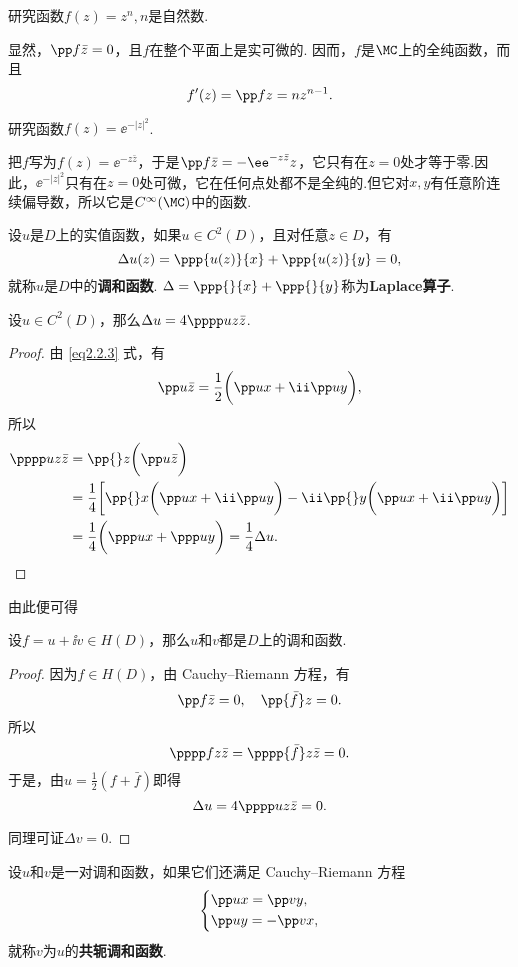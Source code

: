 \begin{example}
研究函数$f(z)=z^n,n$是自然数.
\end{example}
\begin{solution}
  显然，$\pp f{\bar z}=0$，且$f$在整个平面上是实可微的. 因而，$f$是$\MC$上的全纯函数，而且
  \[
    f'(z) = \pp fz = nz^{n-1}. \qedhere
  \]
\end{solution}

\begin{example}
研究函数$f(z)=\ee^{-|z|^2}$.
\end{example}
\begin{solution}
把$f$写为$f(z)=\ee^{-z\bar z}$，于是$\pp f{\bar z}=-\ee^{-z\bar z}z$，它只有在$z=0$处才等于零.因此，$\ee^{-|z|^2}$只有在$z=0$处可微，它在任何点处都不是全纯的.但它对$x,y$有任意阶连续偏导数，所以它是$C^\infty(\MC)$中的函数.
\end{solution}

\begin{definition}\label{def2.2.7}
  设$u$是$D$上的实值函数，如果$u\in C^2(D)$，且对任意$z\in D$，有
  \[\Delta u(z)=\ppp{u(z)}{x}+\ppp{u(z)}{y}=0,\]
就称$u$是$D$中的\textbf{调和函数}. $\Delta =\ppp{}{x}+\ppp{}{y}$称为\textbf{Laplace算子}.
\end{definition}

\begin{prop}\label{prop2.2.8}
设$u\in C^2(D)$，那么$\Delta u=4\pppp uz{\bar z}$.
\end{prop}
\begin{proof}
由 \eqref{eq2.2.3} 式，有
\[\pp u{\bar z}=\frac12\bigg(\pp ux+\ii\pp uy\bigg),\]
所以
\begin{align*}
  \pppp uz{\bar z} & = \pp {}z\bigg(\pp u{\bar z}\bigg)\\
  & = \frac14\bigg[\pp{}x\bigg(\pp ux+\ii \pp uy\bigg)-\ii\pp{}y\bigg(\pp ux+\ii\pp uy\bigg)\bigg]\\
  & = \frac14\bigg(\ppp ux+\ppp uy\bigg)=\frac14\Delta u. \qedhere
\end{align*}
\end{proof}

由此便可得
\begin{theorem}\label{thm2.2.9}
  设$f=u+\ii v\in H(D)$，那么$u$和$v$都是$D$上的调和函数.
\end{theorem}
\begin{proof}
因为$f\in H(D)$，由 Cauchy--Riemann 方程，有
\[\pp f{\bar z}=0,\quad \pp{\bar f}z=0.\]
所以
\[\pppp fz{\bar z}=\pppp{\bar f}z{\bar z}=0.\]
于是，由$u=\frac12(f+\bar f)$即得
\[\Delta u=4\pppp uz{\bar z}=0.\]

同理可证$\Delta v=0$.
\end{proof}
\begin{definition}\label{def2.2.10}
设$u$和$v$是一对调和函数，如果它们还满足 Cauchy--Riemann 方程
\[\left\{\begin{aligned}
&\pp ux=\pp vy,\\
&\pp uy=-\pp vx,
\end{aligned}\right.\]
就称$v$为$u$的\textbf{共轭调和函数}.
\end{definition}

